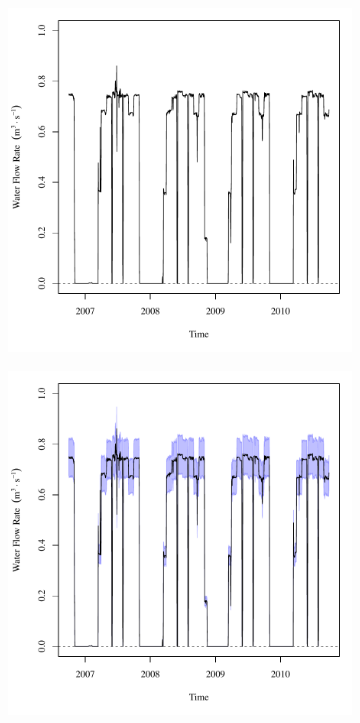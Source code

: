 \begin{linenumbers}
\begin{landscape}
\begin{figure}
\begin{subfigure}{0.7\textwidth}
			\includegraphics[width=\textwidth]{"Figures/Results_USR/Deterministic/Q RFR"}
		\end{subfigure}%
		\begin{subfigure}{0.7\textwidth}
			\centering
			\includegraphics[width=\textwidth]{"Figures/Results_USR/Stochastic/Q RFR"}

\end{subfigure}
\end{figure}
\end{landscape}
\end{linenumbers}
